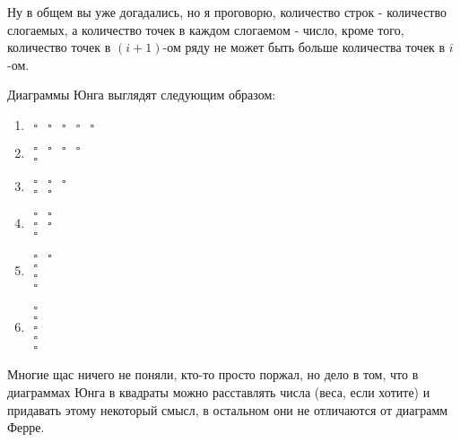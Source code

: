 Ну в общем вы уже догадались, но я проговорю, количество строк - количество слогаемых, а количество точек в каждом слогаемом - число, кроме того, количество точек в $\left(i+1\right)$-ом ряду не может быть больше количества точек в $i$-ом.

Диаграммы Юнга выглядят следующим образом:

\begin{enumerate}
\item $\begin{matrix}
	\square & \square & \square & \square & \square
	\end{matrix}$

\item $\begin{matrix}
	\square & \square & \square & \square \\
	\square
	\end{matrix}$

\item $\begin{matrix}
	\square & \square & \square \\
	\square & \square
	\end{matrix}$

\item $\begin{matrix}
	\square & \square \\
	\square & \square \\
	\square
	\end{matrix}$

\item $\begin{matrix}
	\square & \square \\
	\square \\
	\square \\
	\square
	\end{matrix}$

\item $\begin{matrix}
	\square \\
	\square \\
	\square \\
	\square \\
	\square
	\end{matrix}$
\end{enumerate}

Многие щас ничего не поняли, кто-то просто поржал, но дело в том, что в диаграммах Юнга в квадраты можно расставлять числа (веса, если хотите) и придавать этому некоторый смысл, в остальном они не отличаются от диаграмм Ферре.
